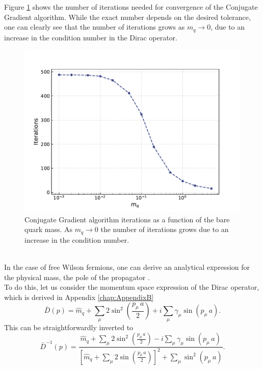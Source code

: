 Figure \ref{fig:correlator_CGiter} shows the number of iterations needed for convergence of the Conjugate Gradient algorithm. While the exact number depends on the desired tolerance, one can clearly see that the number of iterations grows as $m_q \to 0$, due to an increase in the condition number \cite{cond_num_ref} in the Dirac operator. \\
\begin{figure}[h!]
    \centering 
    \includegraphics[scale=0.6]{figures/correlator/CGiter.pdf}
    \caption[Conjugate Gradient algorithm iterations as a function of the bare quark mass.]{Conjugate Gradient algorithm iterations as a function of the bare quark mass. As $m_q \to 0$ the number of iterations grows due to an increase in the condition number.}
    \label{fig:correlator_CGiter}
\end{figure} \\
In the case of free Wilson fermions, one can derive an analytical expression for the physical mass, the pole of the propagator \cite{Montvay1994QuantumLattice}. \\
To do this, let us consider the momentum space expression of the Dirac operator, which is derived in Appendix \ref{chap:AppendixB}
\begin{equation*}
\bar{D}(p)= \hat{m}_q + \sum_\mu 2 \sin ^2\left(\frac{p_\mu \, a}{2}\right)+i \sum_\mu \gamma_\mu \sin \left(p_\mu \, a\right).
\end{equation*}
This can be straightforwardly inverted to
\begin{equation*}
    \bar{D}^{-1}(p) = \frac{\hat{m}_q + \sum_\mu 2 \sin ^2\left(\frac{p_\mu \, a}{2}\right) - i \sum_\mu \gamma_\mu \sin \left(p_\mu \, a\right)}{\left[\hat{m}_q + \sum_\mu 2 \sin\left(\frac{p_\mu \, a}{2}\right)\right]^2 + \sum_\mu \sin^2 \left(p_\mu \, a\right)}.
\end{equation*}
